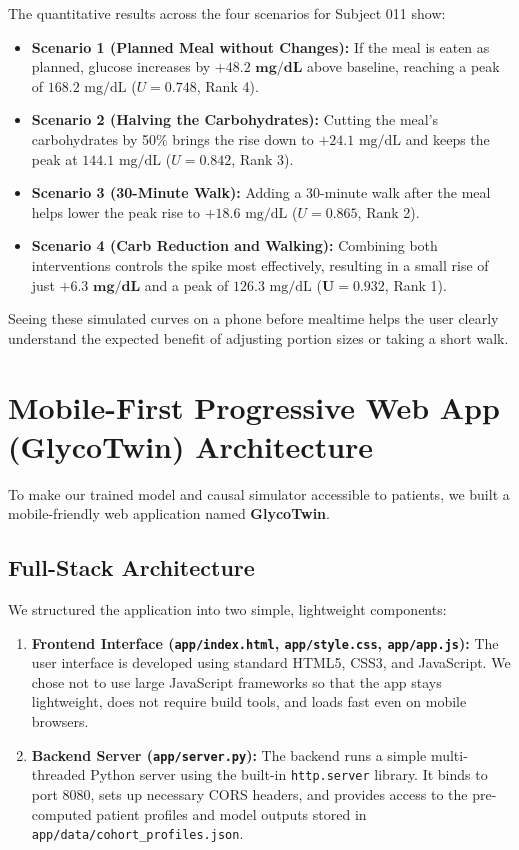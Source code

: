 The quantitative results across the four scenarios for Subject 011 show:
\begin{itemize}
    \item \textbf{Scenario 1 (Planned Meal without Changes):} If the meal is eaten as planned, glucose increases by $\mathbf{+48.2\text{ mg/dL}}$ above baseline, reaching a peak of $168.2\text{ mg/dL}$ ($U = 0.748$, Rank 4).
    \item \textbf{Scenario 2 (Halving the Carbohydrates):} Cutting the meal's carbohydrates by 50\% brings the rise down to $+24.1\text{ mg/dL}$ and keeps the peak at $144.1\text{ mg/dL}$ ($U = 0.842$, Rank 3).
    \item \textbf{Scenario 3 (30-Minute Walk):} Adding a 30-minute walk after the meal helps lower the peak rise to $+18.6\text{ mg/dL}$ ($U = 0.865$, Rank 2).
    \item \textbf{Scenario 4 (Carb Reduction and Walking):} Combining both interventions controls the spike most effectively, resulting in a small rise of just $\mathbf{+6.3\text{ mg/dL}}$ and a peak of $126.3\text{ mg/dL}$ ($\mathbf{U = 0.932}$, Rank 1).
\end{itemize}

Seeing these simulated curves on a phone before mealtime helps the user clearly understand the expected benefit of adjusting portion sizes or taking a short walk.

\section{Mobile-First Progressive Web App (GlycoTwin) Architecture}
To make our trained model and causal simulator accessible to patients, we built a mobile-friendly web application named \textbf{GlycoTwin}.

\subsection{Full-Stack Architecture}
We structured the application into two simple, lightweight components:
\begin{enumerate}
    \item \textbf{Frontend Interface (\texttt{app/index.html}, \texttt{app/style.css}, \texttt{app/app.js}):} The user interface is developed using standard HTML5, CSS3, and JavaScript. We chose not to use large JavaScript frameworks so that the app stays lightweight, does not require build tools, and loads fast even on mobile browsers.
    \item \textbf{Backend Server (\texttt{app/server.py}):} The backend runs a simple multi-threaded Python server using the built-in \texttt{http.server} library. It binds to port 8080, sets up necessary CORS headers, and provides access to the pre-computed patient profiles and model outputs stored in \texttt{app/data/cohort_profiles.json}.
\end{enumerate}

